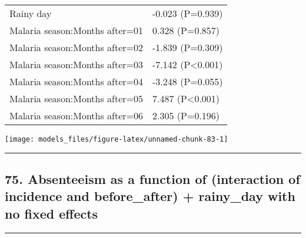 \documentclass[]{article}
\begin{document}
\begin{longtable}[t]{ll}
\hspace{1em}Rainy day & -0.023 (P=0.939)\\
\hspace{1em}Malaria season:Months after=01 & 0.328 (P=0.857)\\
\hspace{1em}Malaria season:Months after=02 & -1.839 (P=0.309)\\
\hspace{1em}Malaria season:Months after=03 & -7.142 (P<0.001)\\
\hspace{1em}Malaria season:Months after=04 & -3.248 (P=0.055)\\
\hspace{1em}Malaria season:Months after=05 & 7.487 (P<0.001)\\
\hspace{1em}Malaria season:Months after=06 & 2.305 (P=0.196)\\*
\end{longtable}

\begin{center}\texttt{[image: models\_files/figure-latex/unnamed-chunk-83-1]} \end{center}

\newpage

\begin{center}\rule{0.5\linewidth}{\linethickness}\end{center}

\subsection{75. Absenteeism as a function of (interaction of incidence
and before\_after) + rainy\_day with no fixed
effects}\label{absenteeism-as-a-function-of-interaction-of-incidence-and-before_after-rainy_day-with-no-fixed-effects}

\begin{center}\rule{0.5\linewidth}{\linethickness}\end{center}
\end{document}

